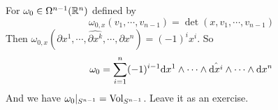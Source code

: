 \begin{example}
    For  $ \omega_0\in\Omega^{n-1}(\mathbb R^n ) $ defined by 
    \[\omega_{0,x}(v_1,\cdots,v_{n-1})=\det(x,v_1,\cdots,v_{n-1})\]
    Then   $ \omega_{0,x}(\partial x^1,\cdots,\hat{\partial x^k},\cdots,\partial x^n)=(-1)^ix^i $. 
    So 
    \[\omega_0=\displaystyle\sum_{i=1}^n(-1)^{i-1}\mathrm{d} x^1\wedge\cdots\wedge\hat{\mathrm{d} x^i}\wedge\cdots\wedge\mathrm{d} x^n\]
    And we have  $ \omega_0|_{S^{n-1}}=\mathrm{Vol}_{S^{n-1}} $. Leave it as an exercise. 
\end{example}